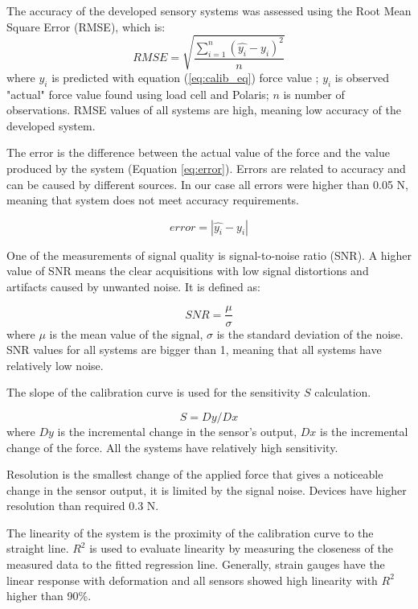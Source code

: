 The accuracy of the developed sensory systems was assessed using the Root Mean Square Error (RMSE), which is:
\begin{equation}
RMSE = \sqrt{\frac{\sum_{i=1}^{n}{{(\hat{y_i} - y_i)}^2}}{n}}
\end{equation}
where $\hat{y_i}$ is predicted with equation (\ref{eq:calib_eq}) force value ; $y_i$ is observed "actual" force value found using load cell and Polaris; $n$ is number of observations.
RMSE values of all systems are high, meaning low accuracy of the developed system.

The error is the difference between the actual value of the force and the value produced by the system (Equation \ref{eq:error}). Errors are related to accuracy and can be caused by different sources. In our case all errors were higher than 0.05 N, meaning that system does not meet accuracy requirements.

\begin{equation}\label{eq:error}
error = |\hat{y_i} - y_i|
\end{equation}

One of the measurements of signal quality is signal-to-noise ratio (SNR). A higher value of SNR means the clear acquisitions with low signal distortions and artifacts caused by unwanted noise. It is defined as:

\begin{equation}
SNR=\frac{\mu}{\sigma}
\end{equation}
where $\mu$ is the mean value of the signal, $\sigma$ is the standard deviation of the noise. SNR values for all systems are bigger than 1, meaning that all systems have relatively low noise.

The slope of the calibration curve is used for the sensitivity $S$ calculation.

\begin{equation}
S = Dy/Dx
\end{equation}
where $Dy$ is the incremental change in the sensor’s output, $Dx$ is the incremental change of the force. All the systems have relatively high sensitivity.

Resolution is the smallest change of the applied force that gives a noticeable change in the sensor output, it is limited by the signal noise. Devices have higher resolution than required 0.3 N.

The linearity of the system is the proximity of the calibration curve to the straight line. $R^2$ is used to evaluate linearity by measuring the closeness of the measured data to the fitted regression line. Generally, strain gauges have the linear response with deformation and all sensors showed high linearity with $R^2$ higher than 90\%.


